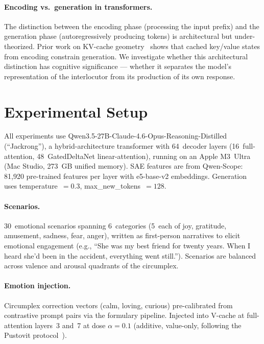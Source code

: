 \documentclass[11pt,a4paper]{article}
\begin{document}
\paragraph{Encoding vs.\ generation in transformers.}
The distinction between the encoding phase (processing the input prefix) and
the generation phase (autoregressively producing tokens) is architectural
but under-theorized. Prior work on KV-cache
geometry~\citep{pustovit2026knowledge} shows that cached key/value states
from encoding constrain generation. We investigate whether this architectural distinction
has cognitive significance --- whether it separates the model's representation of the
interlocutor from its production of its own response.

\section{Experimental Setup}
\label{sec:setup}

All experiments use Qwen3.5-27B-Claude-4.6-Opus-Reasoning-Distilled
(``Jackrong''), a hybrid-architecture transformer with 64~decoder layers
(16~full-attention, 48~GatedDeltaNet linear-attention), running on an Apple
M3~Ultra (Mac Studio, 273~GB unified memory). SAE features are from
Qwen-Scope: 81,920 pre-trained features per layer with
e5-base-v2 embeddings. Generation uses temperature~$= 0.3$,
max\_new\_tokens~$= 128$.

\paragraph{Scenarios.} 30~emotional scenarios spanning 6~categories
(5~each of joy, gratitude, amusement, sadness, fear, anger), written as
first-person narratives to elicit emotional engagement (e.g., ``She was my
best friend for twenty years. When I heard she'd been in the accident,
everything went still.''). Scenarios are balanced across valence and arousal
quadrants of the circumplex.

\paragraph{Emotion injection.} Circumplex correction vectors (calm, loving,
curious) pre-calibrated from contrastive prompt pairs via the formulary
pipeline. Injected into V-cache at full-attention layers~3 and~7 at dose
$\alpha{=}0.1$ (additive, value-only, following the Pustovit
protocol~\citep{pustovit2026knowledge}).
\end{document}
